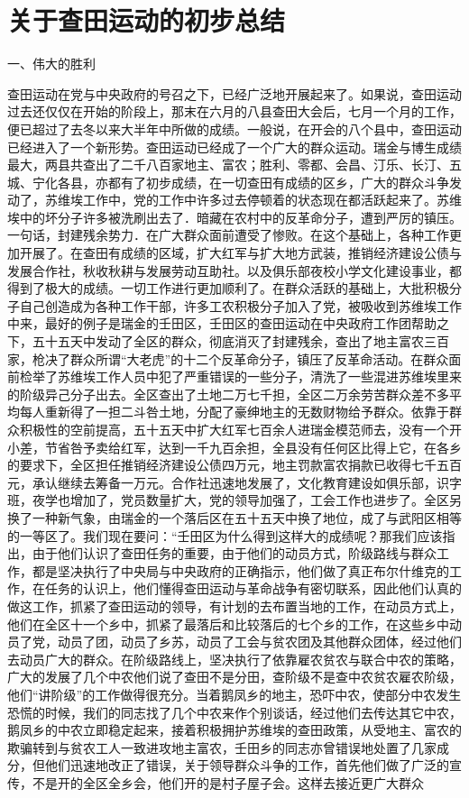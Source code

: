 \section[关于查田运动的初步总结（一九三三年）]{关于查田运动的初步总结}


一、伟大的胜利

查田运动在党与中央政府的号召之下，已经广泛地开展起来了。如果说，查田运动过去还仅仅在开始的阶段上，那末在六月的八县查田大会后，七月一个月的工作，便已超过了去冬以来大半年中所做的成绩。一般说，在开会的八个县中，查田运动已经进入了一个新形势。查田运动已经成了一个广大的群众运动。瑞金与博生成绩最大，两县共查出了二千八百家地主、富农；胜利、零都、会昌、汀乐、长汀、五城、宁化各县，亦都有了初步成绩，在一切查田有成绩的区乡，广大的群众斗争发动了，苏维埃工作中，党的工作中许多过去停顿着的状态现在都活跃起来了。苏维埃中的坏分子许多被洗刷出去了．暗藏在农村中的反革命分子，遭到严厉的镇压。一句话，封建残余势力．在广大群众面前遭受了惨败。在这个基础上，各种工作更加开展了。在查田有成绩的区域，扩大红军与扩大地方武装，推销经济建设公债与发展合作社，秋收秋耕与发展劳动互助社。以及俱乐部夜校小学文化建设事业，都得到了极大的成绩。一切工作进行更加顺利了。在群众活跃的基础上，大批积极分子自己创造成为各种工作干部，许多工农积极分子加入了党，被吸收到苏维埃工作中来，最好的例子是瑞金的壬田区，壬田区的查田运动在中央政府工作团帮助之下，五十五天中发动了全区的群众，彻底消灭了封建残余，查出了地主富农三百家，枪决了群众所谓“大老虎”的十二个反革命分子，镇压了反革命活动。在群众面前检举了苏维埃工作人员中犯了严重错误的一些分子，清洗了一些混进苏维埃里来的阶级异己分子出去。全区查出了土地二万七千担，全区二万余劳苦群众差不多平均每人重新得了一担二斗咎土地，分配了豪绅地主的无数财物给予群众。依靠于群众积极性的空前提高，五十五天中扩大红军七百余人进瑞金模范师去，没有一个开小差，节省咎予卖给红军，达到一千九百余担，全县没有任何区比得上它，在各乡的要求下，全区担任推销经济建设公债四万元，地主罚款富农捐款已收得七千五百元，承认继续去筹备一万元。合作社迅速地发展了，文化教育建设如俱乐部，识字班，夜学也增加了，党员数量扩大，党的领导加强了，工会工作也进步了。全区另换了一种新气象，由瑞金的一个落后区在五十五天中换了地位，成了与武阳区相等的一等区了。我们现在要问：“壬田区为什么得到这样大的成绩呢？那我们应该指出，由于他们认识了查田任务的重要，由于他们的动员方式，阶级路线与群众工作，都是坚决执行了中央局与中央政府的正确指示，他们做了真正布尔什维克的工作，在任务的认识上，他们懂得查田运动与革命战争有密切联系，因此他们认真的做这工作，抓紧了查田运动的领导，有计划的去布置当地的工作，在动员方式上，他们在全区十一个乡中，抓紧了最落后和比较落后的七个乡的工作，在这些乡中动员了党，动员了团，动员了乡苏，动员了工会与贫农团及其他群众团体，经过他们去动员广大的群众。在阶级路线上，坚决执行了依靠雇农贫农与联合中农的策略，广大的发展了几个中农他们说了查田不是分田，查阶级不是查中农贫农雇农阶级，他们“讲阶级”的工作做得很充分。当着鹅凤乡的地主，恐吓中农，使部分中农发生恐慌的时候，我们的同志找了几个中农来作个别谈话，经过他们去传达其它中农，鹅凤乡的中农立即稳定起来，接着积极拥护苏维埃的查田政策，从受地主、富农的欺骗转到与贫农工人一致进攻地主富农，壬田乡的同志亦曾错误地处置了几家成分，但他们迅速地改正了错误，关于领导群众斗争的工作，首先他们做了广泛的宣传，不是开的全区全乡会，他们开的是村子屋子会。这样去接近更广大群众
